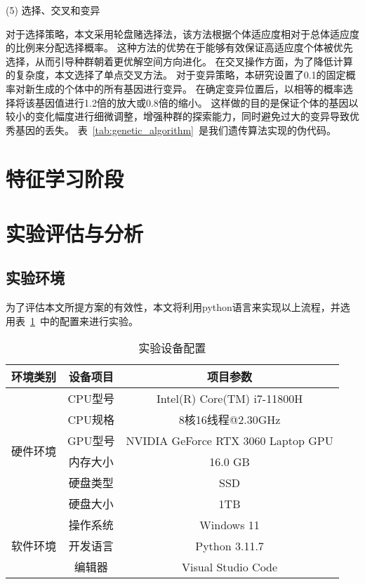 (5) 选择、交叉和变异\par
对于选择策略，本文采用轮盘赌选择法，该方法根据个体适应度相对于总体适应度的比例来分配选择概率。
这种方法的优势在于能够有效保证高适应度个体被优先选择，从而引导种群朝着更优解空间方向进化。
在交叉操作方面，为了降低计算的复杂度，本文选择了单点交叉方法。
对于变异策略，本研究设置了0.1的固定概率对新生成的个体中的所有基因进行变异。
在确定变异位置后，以相等的概率选择将该基因值进行1.2倍的放大或0.8倍的缩小。
这样做的目的是保证个体的基因以较小的变化幅度进行细微调整，增强种群的探索能力，同时避免过大的变异导致优秀基因的丢失。
表~\ref{tab:genetic_algorithm}~是我们遗传算法实现的伪代码。


\section{特征学习阶段}

\section{实验评估与分析}
\subsection{实验环境}
为了评估本文所提方案的有效性，本文将利用python语言来实现以上流程，并选用表~\ref{tab:env_setting}~中的配置来进行实验。
\begin{table}[htbp]
  \caption{实验设备配置}
  \label{tab:env_setting}
  \centering
  \begin{tabular}{ccc}
    \toprule
    \textbf{环境类别} & \textbf{设备项目} & \textbf{项目参数}\\
    \midrule
    \multirow{6}{*}{硬件环境}& CPU型号 & Intel(R) Core(TM) i7-11800H\\
                            & CPU规格 & 8核16线程@2.30GHz\\
                            & GPU型号 & NVIDIA GeForce RTX 3060 Laptop GPU\\
                            & 内存大小& 16.0 GB\\
                            & 硬盘类型& SSD\\
                            & 硬盘大小& 1TB\\
                            \hline
    \multirow{3}{*}{软件环境}&操作系统&Windows 11\\
                            &开发语言&Python 3.11.7\\
                            &编辑器 &Visual Studio Code\\                       
    \bottomrule
  \end{tabular}
\end{table}

